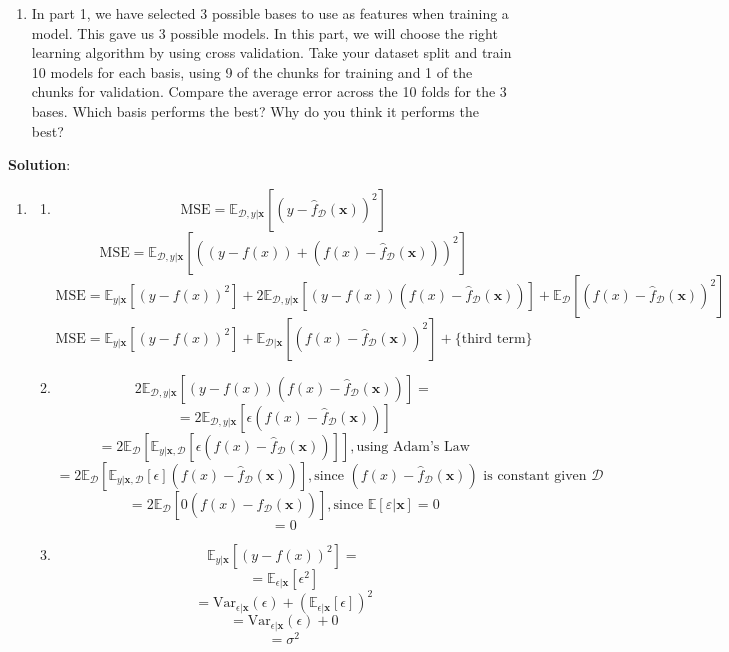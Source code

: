\documentclass[submit]{../harvardml}
\newenvironment{solution}{
    \vspace{2mm}
    \color{blue}\noindent\textbf{Solution}:
}{}
\begin{document}
\begin{problem}
\begin{enumerate}
  
      \item In part 1, we have selected 3 possible bases to use as features when training a model. This gave us 3 possible models. In this part, we will choose the right learning algorithm by using cross validation. Take your dataset split and train 10 models for each basis, using 9 of the chunks for training and 1 of the chunks for validation. Compare the average error across the 10 folds for the 3 bases. Which basis performs the best? Why do you think it performs the best?    

      
  \end{enumerate}
\end{problem}

\newpage

\begin{solution}
	\begin{enumerate}
    \item \begin{enumerate}
            \item $$\text{MSE} = \mathbb{E}_{\mathcal{D}, y|\mathbf{x}}[(y - \hat f_\mathcal{D}(\mathbf{x}))^2]$$ $$\text{MSE} = \mathbb{E}_{\mathcal{D}, y|\mathbf{x}}[((y - f(x)) + (f(x) - \hat f_\mathcal{D}(\mathbf{x})))^2]$$ $$\text{MSE} = \mathbb{E}_{y|\mathbf{x}}[(y - f(x))^2] + 2\mathbb{E}_{\mathcal{D},y|\mathbf{x}}[(y - f(x))(f(x) - \hat f_\mathcal{D}(\mathbf{x}))] + \mathbb{E}_{\mathcal{D}}[(f(x) - \hat f_\mathcal{D}(\mathbf{x}))^2]$$ $$\text{MSE} = \mathbb{E}_{y|\mathbf{x}}[(y - f(x))^2] + \mathbb{E}_{\mathcal{D}|\mathbf{x}}[(f(x) - \hat f_\mathcal{D}(\mathbf{x}))^2] + \text{\{third term\}}$$
            \item $$2\mathbb{E}_{\mathcal{D},y|\mathbf{x}}[(y - f(x))(f(x) - \hat f_\mathcal{D}(\mathbf{x}))] =$$ $$= 2\mathbb{E}_{\mathcal{D},y|\mathbf{x}}[\epsilon(f(x) - \hat f_\mathcal{D}(\mathbf{x}))]$$ $$= 2\mathbb{E}_{\mathcal{D}}[\mathbb{E}_{y|\mathbf{x}, \mathcal{D}}[\epsilon(f(x) - \hat f_\mathcal{D}(\mathbf{x}))]], \text{using Adam's Law}$$ $$= 2\mathbb{E}_{\mathcal{D}}[\mathbb{E}_{y|\mathbf{x}, \mathcal{D}}[\epsilon](f(x) - \hat f_\mathcal{D}(\mathbf{x}))], \text{since $(f(x) - \hat f_\mathcal{D}(\mathbf{x}))$ is constant given $\mathcal{D}$}$$ $$= 2\mathbb{E}_{\mathcal{D}}[0(f(x) - \hat f_\mathcal{D}(\mathbf{x}))], \text{since $\mathbb{E}[\varepsilon|\mathbf{x}] = 0$}$$ $$= 0$$
            \item $$\mathbb{E}_{y|\mathbf{x}}[(y - f(x))^2] = $$ $$ = \mathbb{E}_{\epsilon|\mathbf{x}}[\epsilon^2]$$ $$ = \text{Var}_{\epsilon|\mathbf{x}} (\epsilon) + (\mathbb{E}_{\epsilon|\mathbf{x}}[\epsilon])^2$$ $$ = \text{Var}_{\epsilon|\mathbf{x}} (\epsilon) + 0$$ $$ = \sigma^2$$

\end{enumerate}
\end{enumerate}
\end{solution}
\end{document}
